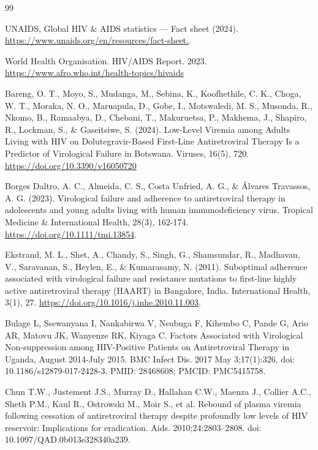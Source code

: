 \documentclass[10pt]{NSP1}
\begin{document}
\begin{thebibliography}{99}

UNAIDS, Global HIV \& AIDS statistics — Fact sheet (2024). \url{https://www.unaids.org/en/resources/fact-sheet.}. 

World Health Organisation. HIV/AIDS Report. 2023. \url{https://www.afro.who.int/health-topics/hivaids}

Bareng, O. T., Moyo, S., Mudanga, M., Sebina, K., Koofhethile, C. K., Choga, W. T., Moraka, N. O., Maruapula, D., Gobe, I., Motswaledi, M. S., Musonda, R., Nkomo, B., Ramaabya, D., Chebani, T., Makuruetsa, P., Makhema, J., Shapiro, R., Lockman, S., \& Gaseitsiwe, S. (2024). Low-Level Viremia among Adults Living with HIV on Dolutegravir-Based First-Line Antiretroviral Therapy Is a Predictor of Virological Failure in Botswana. Viruses, 16(5), 720. \url{https://doi.org/10.3390/v16050720}

Borges Daltro, A. C., Almeida, C. S., Costa Unfried, A. G., \& Álvares Travassos, A. G. (2023). Virological failure and adherence to antiretroviral therapy in adolescents and young adults living with human immunodeficiency virus. Tropical Medicine \& International Health, 28(3), 162-174. \url{https://doi.org/10.1111/tmi.13854}.




Ekstrand, M. L., Shet, A., Chandy, S., Singh, G., Shamsundar, R., Madhavan, V., Saravanan, S., Heylen, E., \& Kumarasamy, N. (2011). Suboptimal adherence associated with virological failure and resistance mutations to first-line highly active antiretroviral therapy (HAART) in Bangalore, India. International Health, 3(1), 27. \url{https://doi.org/10.1016/j.inhe.2010.11.003}.


Bulage L, Ssewanyana I, Nankabirwa V, Nsubuga F, Kihembo C, Pande G, Ario AR, Matovu JK, Wanyenze RK, Kiyaga C. Factors Associated with Virological Non-suppression among HIV-Positive Patients on Antiretroviral Therapy in Uganda, August 2014-July 2015. BMC Infect Dis. 2017 May 3;17(1):326. doi: 10.1186/s12879-017-2428-3. PMID: 28468608; PMCID: PMC5415758.

Chun T.W., Justement J.S., Murray D., Hallahan C.W., Maenza J., Collier A.C., Sheth P.M., Kaul R., Ostrowski M., Moir S., et al. Rebound of plasma viremia following cessation of antiretroviral therapy despite profoundly low levels of HIV reservoir: Implications for eradication. Aids. 2010;24:2803–2808. doi: 10.1097/QAD.0b013e328340a239.


\end{thebibliography}
\end{document}
